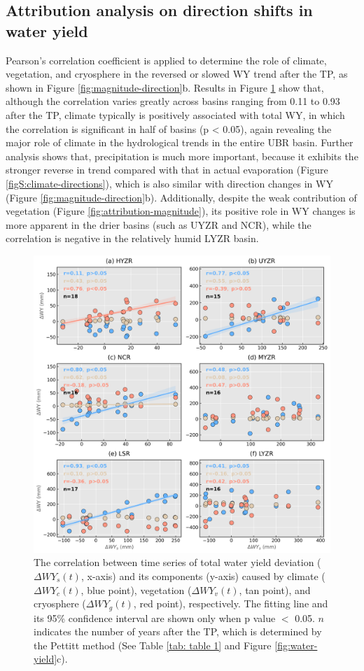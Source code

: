 \documentclass[hess, manuscript]{copernicus}
\begin{document}
\subsection{Attribution analysis on direction shifts in water yield}
Pearson’s correlation coefficient is applied to determine the role of climate, vegetation, and cryosphere in the reversed or slowed WY trend after the TP, as shown in Figure \ref{fig:magnitude-direction}b.
Results in Figure \ref{fig:attribution-direction} show that, although the correlation varies greatly across basins ranging from 0.11 to 0.93 after the TP, climate typically is positively associated with total WY, in which the correlation is significant in half of basins (p < 0.05), again revealing the major role of climate in the hydrological trends in the entire UBR basin. 
Further analysis shows that, precipitation is much more important, because it exhibits the stronger reverse in trend compared with that in actual evaporation (Figure \ref{figS:climate-directions}), which is also similar with direction changes in WY (Figure \ref{fig:magnitude-direction}b). 
Additionally, despite the weak contribution of vegetation (Figure \ref{fig:attribution-magnitude}), its positive role in WY changes is more apparent in the drier basins (such as UYZR and NCR), while the correlation is negative in the relatively humid LYZR basin.

\begin{figure}[ht]
    \includegraphics[width=12cm]{02-figures/contribution-relations.png}
    \caption{The correlation between time series of total water yield deviation ($\Delta WY_s(t)$, x-axis) and its components (y-axis) caused by climate ($\Delta WY_c(t)$, blue point), vegetation ($\Delta WY_v(t)$, tan point), and cryosphere ($\Delta WY_g(t)$, red point), respectively.
    The fitting line and its 95\% confidence interval are shown only when p value $<$ 0.05. $n$ indicates the number of years after the TP, which is determined by the Pettitt method (See Table \ref{tab: table 1} and Figure \ref{fig:water-yield}c).}
    \label{fig:attribution-direction}
\end{figure}
\end{document}
